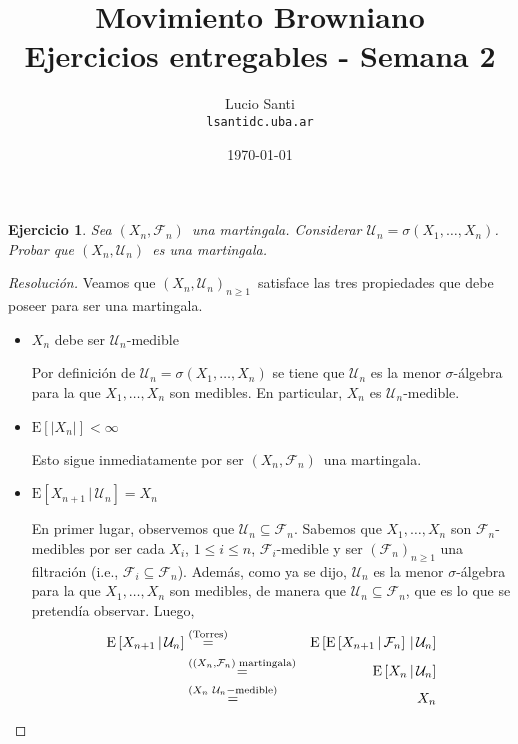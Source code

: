 \documentclass[a4paper,11pt]{article}
\title{Movimiento Browniano\\
      \small{Ejercicios entregables - Semana 2}}
\author{Lucio Santi\\
        \texttt{lsanti\at dc.uba.ar}}
\date{\today}
\newcommand{\abs}[1]{\ensuremath{\left\lvert #1 \right\rvert}}
\newcommand{\Sig}[1]{\ensuremath{\mathcal{#1}}}
\newcommand{\SigAlg}[1]{\ensuremath{\sigma\left(#1\right)}}
\newcommand{\Mart}[2]{\ensuremath{\left(#1_n, \Sig{#2}_n\right)}}
\newcommand{\Exp}[1]{\ensuremath{\textrm{E}\left[#1\right]}}
\newcommand{\ExpC}[2]{\ensuremath{\textrm{E}\left[#1 \, | \, #2\right]}}
\newtheorem*{ej}{Ejercicio}
\begin{document}
\maketitle

\begin{ej} 
    Sea \Mart{X}{F}~una martingala. Considerar $\Sig{U}_n = \SigAlg{X_1, \dots, X_n}$.
    Probar que \Mart{X}{U}~es una martingala.
\end{ej}

\begin{proof}[Resoluci\'on]
Veamos que $\Mart{X}{U}_{n \geq 1}$~satisface las tres propiedades que debe poseer
para ser una martingala. 

\begin{itemize}
    \item $X_n$ debe ser $\Sig{U}_n$-medible

    Por definición de $\Sig{U}_n = \SigAlg{X_1, \dots, X_n}$ se tiene que $\Sig{U}_n$
    es la menor $\sigma$-álgebra para la que $X_1,\dots,X_n$ son medibles. En
    particular, $X_n$ es $\Sig{U}_n$-medible.

    \item $\Exp{\abs{X_n}} < \infty$

    Esto sigue inmediatamente por ser \Mart{X}{F}~una martingala.

    \item $\ExpC{X_{n+1}}{\Sig{U}_n} = X_n$

    En primer lugar, observemos que $\Sig{U}_n \subseteq \Sig{F}_n$. Sabemos que
    $X_1,\dots,X_n$ son $\Sig{F}_n$-medibles por ser cada $X_i$, $1 \leq i \leq n$,
    $\Sig{F}_i$-medible y ser $(\Sig{F}_n)_{n \geq 1}$ una filtración (i.e.,
    $\Sig{F}_i \subseteq \Sig{F}_n$). Además, como ya se dijo, $\Sig{U}_n$ es la
    menor $\sigma$-álgebra para la que $X_1,\dots,X_n$ son medibles, de manera que
    $\Sig{U}_n \subseteq \Sig{F}_n$, que es lo que se pretendía observar. Luego,
    \begin{eqnarray*}
        \ExpC{X_{n+1}}{\Sig{U}_n} &\overset{\tiny{\textrm{(Torres)}}}{=}&
            \ExpC{ \ExpC{X_{n+1}}{\Sig{F}_n} }{\Sig{U}_n} \\
        &\overset{\tiny{(\Mart{X}{F}~\textrm{martingala})}}{=}&
            \ExpC{X_n}{\Sig{U}_n} \\
        &\overset{\tiny{(X_n \,\, \Sig{U}_n-\textrm{medible}})}{=}&
            X_n
    \end{eqnarray*}
\end{itemize}

\end{proof}
\end{document}
